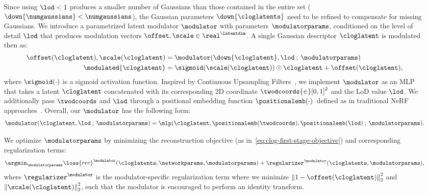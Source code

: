     Since using $\lod < 1$ produces a
    smaller number of Gaussians than those contained in the entire set
    ($\down{\numgaussians} < \numgaussians$), the Gaussian parameters
    $\down{\cloglatents}$ need to be refined to compensate for missing Gaussians.
    We introduce a parametrized latent modulator $\modulator$ with parameters
    $\modulatorparams$, conditioned on the level of detail $\lod$ that produces
    modulation vectors $\offset, \scale\in\real^\latentdim$.
    A single Gaussian descriptor $\cloglatent$ is modulated then as:
    \begin{align}
      \label{eq:clog-modulating}
      \offset(\cloglatent), \scale(\cloglatent) & = \modulator(\down{\cloglatent}, \lod\:;\: \modulatorparams )             \\
      \modulated{\cloglatent}                   & = \sigmoid(\scale(\cloglatent)) \odot \cloglatent + \offset(\cloglatent),
    \end{align}
    where $\sigmoid(\cdot)$ is a sigmoid activation function.
    Inspired by Continuous Upsampling Filters~\cite{vasconcelos2023cuf}, we
    implement $\modulator$ as an MLP that takes a latent $\cloglatent$
    concatenated with its corresponding 2D coordinate $\twodcoords{\in}[0, 1]^2$
    and the LoD value $\lod$.
    We additionally pass $\twodcoords$ and $\lod$ through a positional embedding
    function $\positionalemb(\cdot)$~defined as in traditional NeRF
    approaches~\cite{mildenhall2020nerf}.
    Overall, our $\modulator$ has the following form:
    \begin{equation}
      \label{eq:clog-modulator}
      \modulator(\cloglatent, \lod\:;\:\modulatorparams) = \mlp(\cloglatent, \positionalemb(\twodcoords), \positionalemb(\lod) \:;\:\modulatorparams).
    \end{equation}

    We optimize $\modulatorparams$ by minimizing the reconstruction objective (as in~\cref{eq:clog-first-stage-objective}) and corresponding regularization terms:
    \begin{equation}
      \argmin_{\modulatorparams} \loss{rec}^\modulator(\cloglatents, \networkparams, \modulatorparams)  + \regularizer^\modulator(\cloglatents, \modulatorparams),
    \end{equation}
    where $\regularizer^\modulator$ is the modulator-specific regularization term where we minimize $\left\|1 - \offset(\cloglatent)\right\|_2^2$ and $\left\|\scale(\cloglatent)\right\|_2^2$, such that the modulator is encouraged to perform an identity transform.

